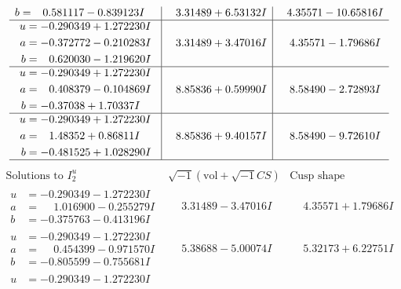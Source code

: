 \documentclass[1p]{elsarticle_modified}
\theoremstyle{definition}
\newcommand{\I}{\sqrt{-1}}
\begin{document}
$$\begin{array}{c|c|c}
\begin{aligned}
b &= \phantom{-}0.581117 - 0.839123 I\end{aligned}
 & \phantom{-}3.31489 + 6.53132 I & \phantom{-}4.35571 - 10.65816 I \\ \hline\begin{aligned}
u &= -0.290349 + 1.272230 I \\
a &= -0.372772 - 0.210283 I \\
b &= \phantom{-}0.620030 - 1.219620 I\end{aligned}
 & \phantom{-}3.31489 + 3.47016 I & \phantom{-}4.35571 - 1.79686 I \\ \hline\begin{aligned}
u &= -0.290349 + 1.272230 I \\
a &= \phantom{-}0.408379 - 0.104869 I \\
b &= -0.37038 + 1.70337 I\end{aligned}
 & \phantom{-}8.85836 + 0.59990 I & \phantom{-}8.58490 - 2.72893 I \\ \hline\begin{aligned}
u &= -0.290349 + 1.272230 I \\
a &= \phantom{-}1.48352 + 0.86811 I \\
b &= -0.481525 + 1.028290 I\end{aligned}
 & \phantom{-}8.85836 + 9.40157 I & \phantom{-}8.58490 - 9.72610 I\\
 \hline 
 \end{array}$$\newpage$$\begin{array}{c|c|c}  
\text{Solutions to }I^u_{2}& \I (\text{vol} + \sqrt{-1}CS) & \text{Cusp shape}\\
 \hline 
\begin{aligned}
u &= -0.290349 - 1.272230 I \\
a &= \phantom{-}1.016900 - 0.255279 I \\
b &= -0.375763 - 0.413196 I\end{aligned}
 & \phantom{-}3.31489 - 3.47016 I & \phantom{-}4.35571 + 1.79686 I \\ \hline\begin{aligned}
u &= -0.290349 - 1.272230 I \\
a &= \phantom{-}0.454399 - 0.971570 I \\
b &= -0.805599 - 0.755681 I\end{aligned}
 & \phantom{-}5.38688 - 5.00074 I & \phantom{-}5.32173 + 6.22751 I \\ \hline\begin{aligned}
u &= -0.290349 - 1.272230 I \\

\end{aligned}
\end{array}$$
\end{document}
